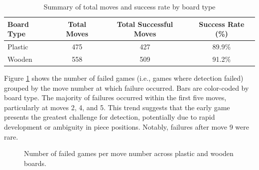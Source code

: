 \begin{table}[htbp]
\centering
\caption[Move detection accuracy board type]{Summary of total moves and success rate by board type}
\label{tab:board-type-accuracy}
\begin{tabular}{lccc}
\toprule
\textbf{Board Type} & \textbf{Total Moves} & \textbf{Total Successful Moves} & \textbf{Success Rate (\%)} \\
\midrule
Plastic & 475 & 427 & 89.9\% \\
Wooden  & 558 & 509 & 91.2\% \\
\bottomrule
\end{tabular}
\end{table}


Figure \ref{fig:move-failures} shows the number of failed games (i.e., games where detection failed) grouped by the move number at which failure occurred. Bars are color-coded by board type. The majority of failures occurred within the first five moves, particularly at moves 2, 4, and 5. This trend suggests that the early game presents the greatest challenge for detection, potentially due to rapid development or ambiguity in piece positions. Notably, failures after move 9 were rare. \\


\begin{figure}[h!]
\centering
{}
\caption[Detection failures per move number]{Number of failed games per move number across plastic and wooden boards.}
\label{fig:move-failures}
\end{figure}


